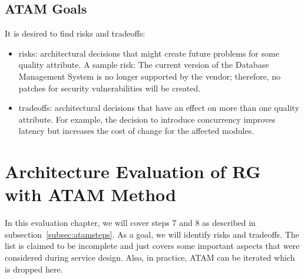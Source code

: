 \subsection{ATAM Goals}
\label{subsec:atamgoa}
It is desired to find risks and tradeoffs:
\begin{itemize}
    \item risks: architectural decisions that might create future problems for some quality attribute. A sample risk: The current version of the Database Management System is no longer supported by the vendor; therefore, no patches for security vulnerabilities will be created.
    \item tradeoffs: architectural decisions that have an effect on more than one quality attribute.     For example, the decision to introduce concurrency improves latency but increases the cost of change for the affected modules. 
\end{itemize}

\section{Architecture Evaluation of RG with ATAM Method}
In this evaluation chapter, we will cover steps 7 and 8 as described in subsection~\ref{subsec:atamsteps}. As a goal, we will identify risks and tradeoffs. The list is claimed to be incomplete and just covers some important aspects that were considered during service design. Also, in practice, ATAM can be iterated which is dropped here.

